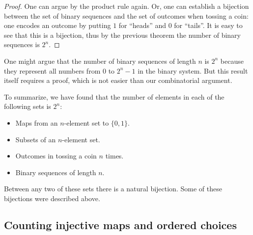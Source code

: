 \begin{page}
\setcounter{section}{2}
\setcounter{subsection}{2}
\setcounter{dfn}{6}
\label{portion:39}

\begin{proof}
One can argue by the product rule again.
Or, one can establish a bijection between the set of binary sequences and the set of outcomes when tossing a coin:
one encodes an outcome by putting $1$ for ``heads'' and $0$ for ``tails''.
It is easy to see that this is a bijection, thus by the previous theorem the number of binary sequences is $2^n$.
\end{proof}


\end{page}

\begin{page}
\setcounter{section}{2}
\setcounter{subsection}{2}
\setcounter{dfn}{7}
\label{portion:41}

\begin{rem}
One might argue that the number of binary sequences of length $n$ is $2^n$ because they represent all numbers from $0$ to $2^n - 1$ in the binary system.
But this result itself requires a proof, which is not easier than our combinatorial argument.
\end{rem}

\end{page}

\begin{page}
\setcounter{section}{2}
\setcounter{subsection}{3}
\setcounter{dfn}{7}
\label{portion:42}


To summarize, we have found that the number of elements in each of the following sets is $2^n$:
\begin{itemize}
\item
Maps from an $n$-element set to $\{0,1\}$.
\item
Subsets of an $n$-element set.
\item
Outcomes in tossing a coin $n$ times.
\item
Binary sequences of length $n$.
\end{itemize}

Between any two of these sets there is a natural bijection.
Some of these bijections were described above.



\end{page}

\begin{page}
\setcounter{section}{2}
\setcounter{subsection}{3}
\setcounter{dfn}{7}
\label{portion:43}

\subsection{Counting injective maps and ordered choices}

\end{page}

